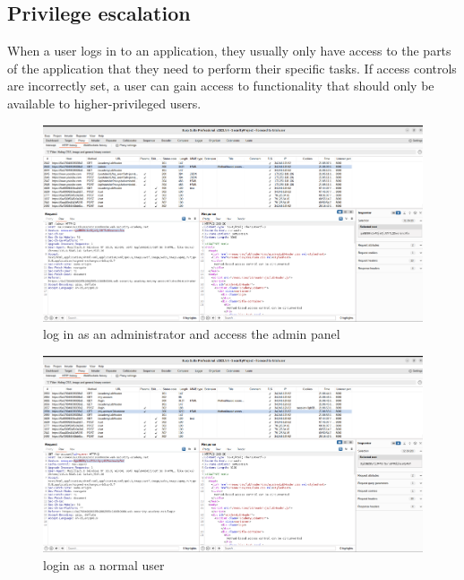 \documentclass[
	a4paper, %
	12pt, %
]{CSSullivanBusinessReport}
\begin{document}
\begin{fullwidth}
\begin{fullwidth}
\end{fullwidth}
\subsection*{Privilege escalation}
\begin{fullwidth}
    
When a user logs in to an application, they usually only have access to the parts of the application that they need to perform their specific tasks. If access controls are incorrectly set, a user can gain access to functionality that should only be available to higher-privileged users.


\begin{figure}[H]
    \centering
    \includegraphics[width=1\textwidth]{Images/anikaScreensots/prev1.png}
    \caption{log in as an administrator and access the admin panel}
    \label{fig:enter-label}
\end{figure}


\begin{figure}[H]
    \centering
    \includegraphics[width=1\textwidth]{Images/anikaScreensots/prev2.png}
    
    \caption{login as a normal user}
    \label{fig:enter-label}
\end{figure}


\end{fullwidth}
\end{fullwidth}
\end{document}
